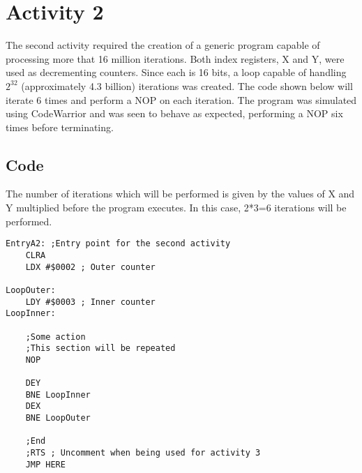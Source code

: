 \section{Activity 2}

The second activity required the creation of a generic program capable of processing more that 16 million iterations.
Both index registers, X and Y, were used as decrementing counters. 
Since each is 16 bits, a loop capable of handling $2^{32}$ (approximately 4.3 billion) iterations was created.
The code shown below will iterate 6 times and perform a NOP on each iteration.
The program was simulated using CodeWarrior and was seen to behave as expected, performing a NOP six times before terminating.


\subsection{Code}

The number of iterations which will be performed is given by the values of X and Y multiplied before the program executes.
In this case, 2*3=6 iterations will be performed.

{\footnotesize
\begin{lstlisting}
EntryA2: ;Entry point for the second activity
	CLRA
	LDX #$0002 ; Outer counter
	
LoopOuter:
	LDY #$0003 ; Inner counter
LoopInner:
		
	;Some action
    ;This section will be repeated
	NOP
	
	DEY
	BNE LoopInner
	DEX
	BNE LoopOuter

	;End
	;RTS ; Uncomment when being used for activity 3
	JMP HERE
\end{lstlisting}
}
